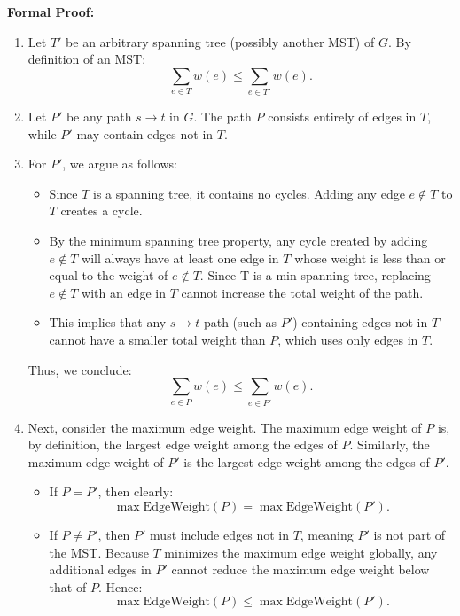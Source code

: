 \documentclass{article}
\begin{document}
\textbf{Formal Proof:}
\begin{enumerate}
    \item Let \( T' \) be an arbitrary spanning tree (possibly another MST) of \( G \). By definition of an MST:
    \begin{equation}
    \sum_{e \in T} w(e) \leq \sum_{e \in T'} w(e). \tag{1}
    \end{equation}
    
    \item Let \( P' \) be any path \( s \to t \) in \( G \). The path \( P \) consists entirely of edges in \( T \), while \( P' \) may contain edges not in \( T \).

    \item For \( P' \), we argue as follows:
    \begin{itemize}
        \item Since \( T \) is a spanning tree, it contains no cycles. Adding any edge \( e \notin T \) to \( T \) creates a cycle.
        \item By the minimum spanning tree property, any cycle created by adding \( e \notin T \) will always have at least one edge in \( T \) whose weight is less than or equal to the weight of \( e \notin T \). Since T is a min spanning tree, replacing \( e \notin T \) with an edge in \( T \) cannot increase the total weight of the path.
        \item This implies that any \( s \to t \) path (such as \( P' \)) containing edges not in \( T \) cannot have a smaller total weight than \( P \), which uses only edges in \( T \).
    \end{itemize}
    Thus, we conclude:
    \begin{equation}
    \sum_{e \in P} w(e) \leq \sum_{e \in P'} w(e). \tag{2}
    \end{equation}
    
    \item Next, consider the maximum edge weight. The maximum edge weight of \( P \) is, by definition, the largest edge weight among the edges of \( P \). Similarly, the maximum edge weight of \( P' \) is the largest edge weight among the edges of \( P' \).

    \begin{itemize}
        \item If \( P = P' \), then clearly:
        \[
        \max \text{EdgeWeight}(P) = \max \text{EdgeWeight}(P').
        \]
        \item If \( P \neq P' \), then \( P' \) must include edges not in \( T \), meaning \( P' \) is not part of the MST. Because \( T \) minimizes the maximum edge weight globally, any additional edges in \( P' \) cannot reduce the maximum edge weight below that of \( P \). Hence:
        \[
        \max \text{EdgeWeight}(P) \leq \max \text{EdgeWeight}(P').
        \]
    \end{itemize}

\end{enumerate}
\end{document}
